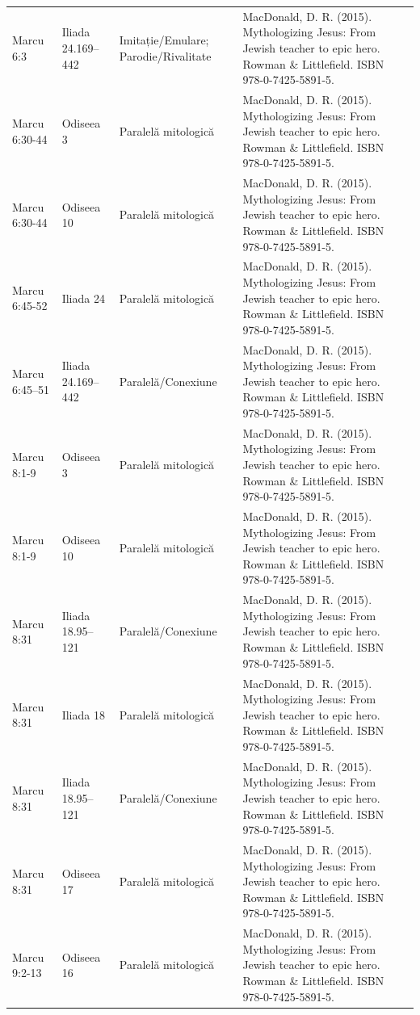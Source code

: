 \documentclass[12pt,a4paper,twoside,openany]{book}
\begin{document}
\begin{longtable}{L{1.4cm}L{1.7cm}L{3.1cm}L{8.4cm}}
Marcu 6:3 & Iliada 24.169–442 & Imitație/Emulare; Parodie/Rivalitate & MacDonald, D. R. (2015). Mythologizing Jesus: From Jewish teacher to epic hero. Rowman \& Littlefield. ISBN 978-0-7425-5891-5. \\
Marcu 6:30-44 & Odiseea 3 & Paralelă mitologică & MacDonald, D. R. (2015). Mythologizing Jesus: From Jewish teacher to epic hero. Rowman \& Littlefield. ISBN 978-0-7425-5891-5. \\
Marcu 6:30-44 & Odiseea 10 & Paralelă mitologică & MacDonald, D. R. (2015). Mythologizing Jesus: From Jewish teacher to epic hero. Rowman \& Littlefield. ISBN 978-0-7425-5891-5. \\
Marcu 6:45-52 & Iliada 24 & Paralelă mitologică & MacDonald, D. R. (2015). Mythologizing Jesus: From Jewish teacher to epic hero. Rowman \& Littlefield. ISBN 978-0-7425-5891-5. \\
Marcu 6:45–51 & Iliada 24.169–442 & Paralelă/Conexiune & MacDonald, D. R. (2015). Mythologizing Jesus: From Jewish teacher to epic hero. Rowman \& Littlefield. ISBN 978-0-7425-5891-5. \\
Marcu 8:1-9 & Odiseea 3 & Paralelă mitologică & MacDonald, D. R. (2015). Mythologizing Jesus: From Jewish teacher to epic hero. Rowman \& Littlefield. ISBN 978-0-7425-5891-5. \\
Marcu 8:1-9 & Odiseea 10 & Paralelă mitologică & MacDonald, D. R. (2015). Mythologizing Jesus: From Jewish teacher to epic hero. Rowman \& Littlefield. ISBN 978-0-7425-5891-5. \\
Marcu 8:31 & Iliada 18.95–121 & Paralelă/Conexiune & MacDonald, D. R. (2015). Mythologizing Jesus: From Jewish teacher to epic hero. Rowman \& Littlefield. ISBN 978-0-7425-5891-5. \\
Marcu 8:31 & Iliada 18 & Paralelă mitologică & MacDonald, D. R. (2015). Mythologizing Jesus: From Jewish teacher to epic hero. Rowman \& Littlefield. ISBN 978-0-7425-5891-5. \\
Marcu 8:31 & Iliada 18.95–121 & Paralelă/Conexiune & MacDonald, D. R. (2015). Mythologizing Jesus: From Jewish teacher to epic hero. Rowman \& Littlefield. ISBN 978-0-7425-5891-5. \\
Marcu 8:31 & Odiseea 17 & Paralelă mitologică & MacDonald, D. R. (2015). Mythologizing Jesus: From Jewish teacher to epic hero. Rowman \& Littlefield. ISBN 978-0-7425-5891-5. \\
Marcu 9:2-13 & Odiseea 16 & Paralelă mitologică & MacDonald, D. R. (2015). Mythologizing Jesus: From Jewish teacher to epic hero. Rowman \& Littlefield. ISBN 978-0-7425-5891-5. \\

\end{longtable}
\end{document}
